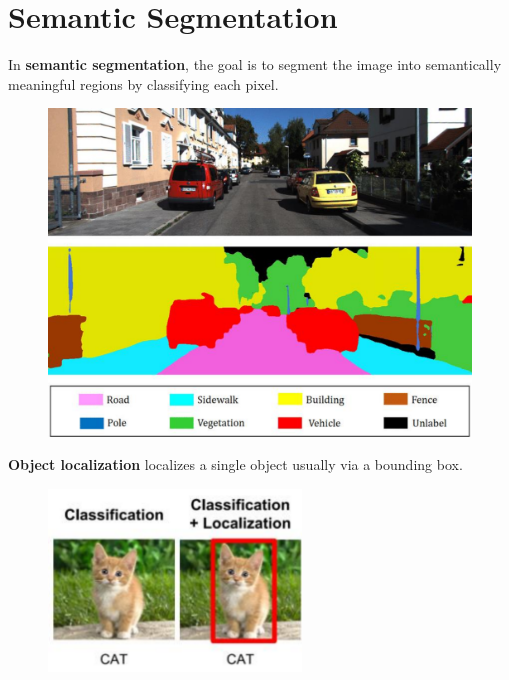 \section{Semantic Segmentation}

\begin{definition}
    In \textbf{semantic segmentation}, the goal is to segment the image into semantically meaningful regions by classifying each pixel.

    \begin{figure}[H]
        \centering
        \includegraphics[width=1.0\textwidth]{.././assets/8.20.png}
    \end{figure}
\end{definition}

\begin{definition}
    \textbf{Object localization} localizes a single object usually via a bounding box.

    \begin{figure}[H]
        \centering
        \includegraphics[width=0.6\textwidth]{.././assets/8.21.png}
    \end{figure}
\end{definition}

